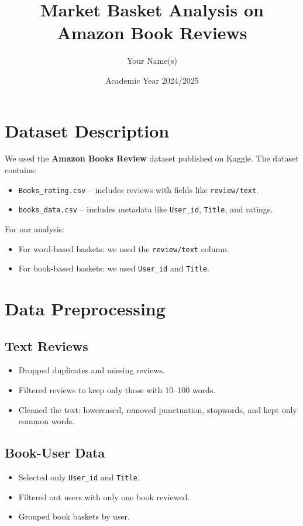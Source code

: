 \documentclass{article}
\title{Market Basket Analysis on Amazon Book Reviews}
\author{Your Name(s)}
\date{Academic Year 2024/2025}
\begin{document}
\maketitle

\section{Dataset Description}
We used the \textbf{Amazon Books Review} dataset published on Kaggle. The dataset contains:
\begin{itemize}
    \item \texttt{Books\_rating.csv} – includes reviews with fields like \texttt{review/text}.
    \item \texttt{books\_data.csv} – includes metadata like \texttt{User\_id}, \texttt{Title}, and ratings.
\end{itemize}

For our analysis:
\begin{itemize}
    \item For word-based baskets: we used the \texttt{review/text} column.
    \item For book-based baskets: we used \texttt{User\_id} and \texttt{Title}.
\end{itemize}

\section{Data Preprocessing}
\subsection*{Text Reviews}
\begin{itemize}
    \item Dropped duplicates and missing reviews.
    \item Filtered reviews to keep only those with 10–100 words.
    \item Cleaned the text: lowercased, removed punctuation, stopwords, and kept only common words.
\end{itemize}

\subsection*{Book-User Data}
\begin{itemize}
    \item Selected only \texttt{User\_id} and \texttt{Title}.
    \item Filtered out users with only one book reviewed.
    \item Grouped book baskets by user.
\end{itemize}
\end{document}
